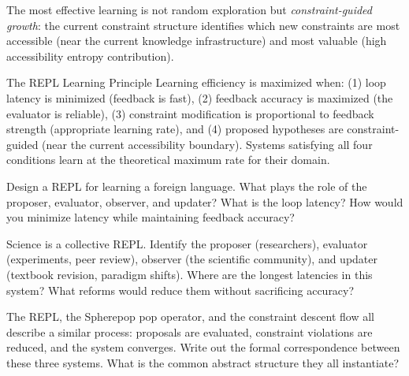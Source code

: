 The most effective learning is not random exploration but
\emph{constraint-guided growth}: the current constraint structure
identifies which new constraints are most accessible (near the
current knowledge infrastructure) and most valuable (high
accessibility entropy contribution).

\begin{namedthm}{The REPL Learning Principle}
  Learning efficiency is maximized when:
  (1) loop latency is minimized (feedback is fast),
  (2) feedback accuracy is maximized (the evaluator is reliable),
  (3) constraint modification is proportional to feedback strength
  (appropriate learning rate), and
  (4) proposed hypotheses are constraint-guided (near the current
  accessibility boundary).
  Systems satisfying all four conditions learn at the theoretical
  maximum rate for their domain.
\end{namedthm}

\begin{exercise}
  Design a REPL for learning a foreign language. What plays the role of
  the proposer, evaluator, observer, and updater? What is the loop
  latency? How would you minimize latency while maintaining feedback
  accuracy?
\end{exercise}

\begin{exercise}
  Science is a collective REPL. Identify the proposer (researchers),
  evaluator (experiments, peer review), observer (the scientific
  community), and updater (textbook revision, paradigm shifts).
  Where are the longest latencies in this system? What reforms would
  reduce them without sacrificing accuracy?
\end{exercise}

\begin{exercise}[title={Synthesis}]
  The REPL, the Spherepop pop operator, and the constraint descent
  flow all describe a similar process: proposals are evaluated,
  constraint violations are reduced, and the system converges.
  Write out the formal correspondence between these three systems.
  What is the common abstract structure they all instantiate?
\end{exercise}
